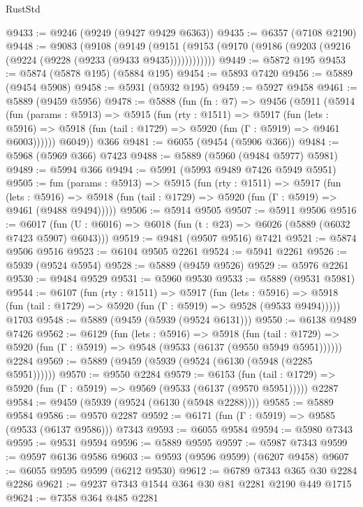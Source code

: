 \begin{lexlean}{RustStd}
\begin{coremodule}
@9433 := @9246 (@9249 (@9427 @9429 @6363))
@9435 := @6357 (@7108 @2190)
@9448 := @9083
    (@9108
      (@9149 (@9151 (@9153 (@9170 (@9186 (@9203 (@9216 (@9224 (@9228 (@9233 (@9433 @9435))))))))))))
@9449 := @5872 @195
@9453 := @5874 (@5878 @195) (@5884 @195)
@9454 := @5893 @7420
@9456 := @5889 (@9454 @5908)
@9458 := @5931 (@5932 @195)
@9459 := @5927 @9458
@9461 := @5889 (@9459 @5956)
@9478 := @5888
    (fun (fn : @7) =>
    @9456
      (@5911
        (@5914
          (fun (params : @5913) =>
          @5915
            (fun (rty : @1511) =>
            @5917
              (fun (lets : @5916) =>
              @5918 (fun (tail : @1729) => @5920 (fun (Γ : @5919) => @9461 @6003))))))
        @6049))
    @366
@9481 := @6055 (@9454 (@5906 @366))
@9484 := @5968 (@5969 @366) @7423
@9488 := @5889 (@5960 (@9484 @5977) @5981)
@9489 := @5994 @366
@9494 := @5991 (@5993 @9489 @7426 @5949 @5951)
@9505 := fun (params : @5913) =>
  @5915
    (fun (rty : @1511) =>
    @5917
      (fun (lets : @5916) =>
      @5918 (fun (tail : @1729) => @5920 (fun (Γ : @5919) => @9461 (@9488 @9494)))))
@9506 := @5914 @9505
@9507 := @5911 @9506
@9516 := @6017 (fun (U : @6016) => @6018 (fun (t : @23) => @6026 (@5889 (@6032 @7423 @5907) @6043)))
@9519 := @9481 (@9507 @9516) @7421
@9521 := @5874 @9506 @9516
@9523 := @6104 @9505 @2261
@9524 := @5941 @2261
@9526 := @5939 (@9524 @5954)
@9528 := @5889 (@9459 @9526)
@9529 := @5976 @2261
@9530 := @9484 @9529
@9531 := @5960 @9530
@9533 := @5889 (@9531 @5981)
@9544 := @6107
    (fun (rty : @1511) =>
    @5917
      (fun (lets : @5916) =>
      @5918 (fun (tail : @1729) => @5920 (fun (Γ : @5919) => @9528 (@9533 @9494)))))
    @1703
@9548 := @5889 (@9459 (@5939 (@9524 @6131)))
@9550 := @6138 @9489 @7426
@9562 := @6129
    (fun (lets : @5916) =>
    @5918
      (fun (tail : @1729) => @5920 (fun (Γ : @5919) => @9548 (@9533 (@6137 (@9550 @5949 @5951))))))
    @2284
@9569 := @5889 (@9459 (@5939 (@9524 (@6130 (@5948 (@2285 @5951))))))
@9570 := @9550 @2284
@9579 := @6153
    (fun (tail : @1729) => @5920 (fun (Γ : @5919) => @9569 (@9533 (@6137 (@9570 @5951)))))
    @2287
@9584 := @9459 (@5939 (@9524 (@6130 (@5948 @2288))))
@9585 := @5889 @9584
@9586 := @9570 @2287
@9592 := @6171 (fun (Γ : @5919) => @9585 (@9533 (@6137 @9586))) @7343
@9593 := @6055 @9584
@9594 := @5980 @7343
@9595 := @9531 @9594
@9596 := @5889 @9595
@9597 := @5987 @7343
@9599 := @9597 @6136 @9586
@9603 := @9593 (@9596 @9599) (@6207 @9458)
@9607 := @6055 @9595 @9599 (@6212 @9530)
@9612 := @6789 @7343 @365 @30 @2284 @2286
@9621 := @9237 @7343 @1544 @364 @30 @81 @2281 @2190 @449 @1715
@9624 := @7358 @364 @485 @2281

\end{coremodule}
\end{lexlean}
